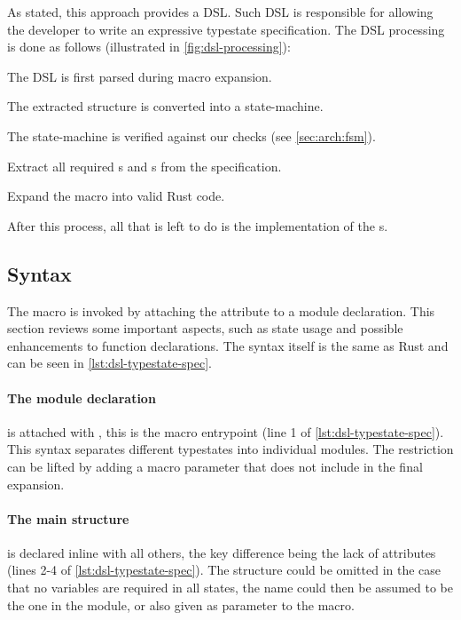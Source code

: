 As stated, this approach provides a DSL.
Such DSL is responsible for allowing the developer to write an expressive typestate specification.
The DSL processing is done as follows (illustrated in \autoref{fig:dsl-processing}):
\begin{compactenum}
    \item The DSL is first parsed during macro expansion.
    \item The extracted structure is converted into a state-machine.
    \item The state-machine is verified against our checks (see \autoref{sec:arch:fsm}).
    \item Extract all required s and s from the specification.
    \item Expand the macro into valid Rust code.
\end{compactenum}
After this process, all that is left to do is the implementation of the s.



\subsection{Syntax}\label{sec:arch:syntax}

The macro is invoked by attaching the \keyword{\#[typestate]} attribute to a module declaration.
This section reviews some important aspects, such as state usage and possible enhancements to function declarations.
The syntax itself is the same as Rust and can be seen in \autoref{lst:dsl-typestate-spec}.

\paragraph{The module declaration} is attached with \keyword{\#[typestate]}, this is the macro entrypoint (line 1 of \autoref{lst:dsl-typestate-spec}).
This syntax separates different typestates into individual modules.
The restriction can be lifted by adding a macro parameter that does not include  in the final expansion.

\paragraph{The main structure} is declared inline with all others, the key difference being the lack of attributes (lines 2-4 of \autoref{lst:dsl-typestate-spec}).
The structure could be omitted in the case that no variables are required in all states,
the name could then be assumed to be the one in the module, or also given as parameter to the macro.

